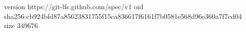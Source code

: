 version https://git-lfs.github.com/spec/v1
oid sha256:cb924bfd87a85623831755f15ca836617f6161f7b0581e568d96e360a7f7cd04
size 349676
